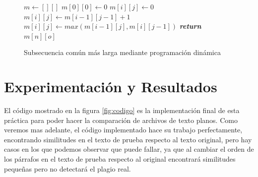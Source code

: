 \documentclass[12pt,twoside]{article}
\begin{document}
\begin{figure}[ht]
    \centering
    \begin{algorithmic}
            \State $m \longleftarrow [][]$
            \State $m[0][0] \longleftarrow 0$
                        \State $m[i][j] \longleftarrow 0$
                        \State $m[i][j] \longleftarrow m[i-1][j-1] + 1$
                    \Else
                        \State $m[i][j] \longleftarrow max(m[i-1][j], m[i][j-1])$
                    \EndIf
                \EndFor
            \EndFor
            \State \textbf{\textit{return}} $m[n][o]$
        \EndProcedure
    \end{algorithmic}
    \caption{Subsecuencia com\'un m\'as larga mediante programaci\'on din\'amica}
    \label{fig:pseudo_sub}
\end{figure}

\section{Experimentaci\'on y Resultados}
El c\'odigo mostrado en la figura \ref{fig:codigo} es la implementaci\'on final de esta pr\'actica para poder hacer la comparaci\'on de archivos de texto planos.
\newline\newline
Como veremos mas adelante, el c\'odigo implementado hace su trabajo perfectamente, encontrando similitudes en el texto de prueba respecto al texto original, pero hay casos en los que podemos observar que puede fallar, ya que al cambiar el orden de los p\'arrafos en el texto de prueba respecto al original encontrará similitudes pequeñas pero no detectará el plagio real.
\end{document}
